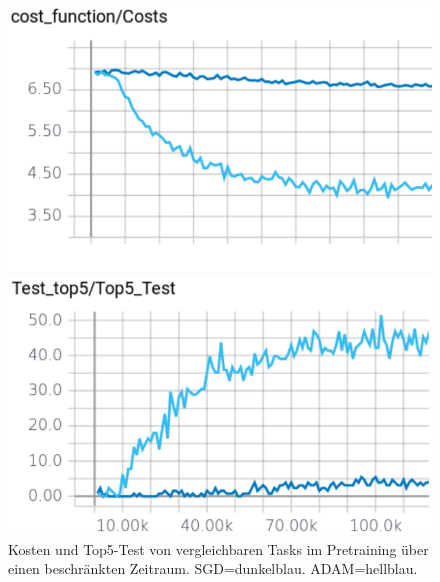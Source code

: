 \begin{figure}
	\centering
	\begin{minipage}[b]{0.48\textwidth}	
		\includegraphics[width=\textwidth]{Kapitel/20Pretraining/Bilder/SGDvsADAMcost.pdf}
	\end{minipage}
	\hfill
	\begin{minipage}[b]{0.48\textwidth}		
		\includegraphics[width=\textwidth]{Kapitel/20Pretraining/Bilder/SGDvsADAMtop5.pdf}
	\end{minipage}
	\caption{Kosten und Top5-Test von vergleichbaren Tasks im Pretraining über einen beschränkten Zeitraum. 
	SGD=dunkelblau.
	ADAM=hellblau.}
	\label{img:SGDvsADAM}
\end{figure}
